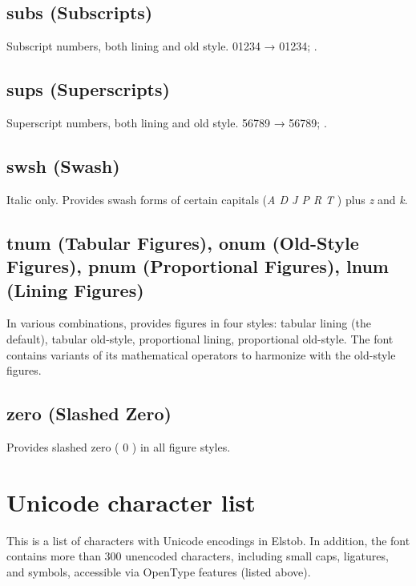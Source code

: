 \documentclass[12pt,letterpaper,openany]{book}
\begin{document}
\section{subs (Subscripts)}
Subscript numbers, both lining and old style. 01234 →
{ 01234};
.

\section{sups (Superscripts)}
Superscript numbers, both lining and old style. 56789 →
{ 56789};
.

\section{swsh (Swash)}
Italic only. Provides swash forms of certain capitals
{(\textit{A D J P R T} ) plus \textit{z} and \textit{k}.}

\section{tnum (Tabular Figures), onum (Old-Style Figures), pnum (Proportional
Figures), lnum (Lining Figures)}
In various combinations, provides figures in four styles:
tabular lining (the default),
tabular old-style,
proportional lining,
proportional old-style. The font contains variants of its mathematical
operators to harmonize with the old-style figures.

\section{zero (Slashed Zero)}
Provides slashed zero ({ 0 }) in all figure styles.

\chapter{Unicode character list}

This is a list of characters with Unicode encodings in Elstob. In addition, the
font contains more than 300 unencoded characters, including small
caps, ligatures, and symbols, accessible via OpenType features (listed above).
\end{document}
